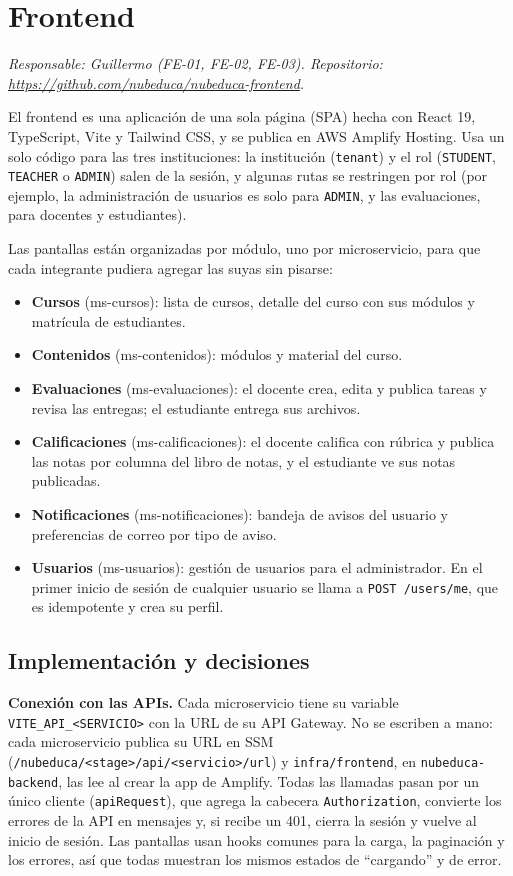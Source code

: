 \section{Frontend}
\label{sec:frontend}
\textit{Responsable: Guillermo (FE-01, FE-02, FE-03). Repositorio: \url{https://github.com/nubeduca/nubeduca-frontend}.}

El frontend es una aplicación de una sola página (SPA) hecha con React 19, TypeScript, Vite y
Tailwind CSS, y se publica en AWS Amplify Hosting. Usa un solo código para las tres instituciones:
la institución (\texttt{tenant}) y el rol (\texttt{STUDENT}, \texttt{TEACHER} o \texttt{ADMIN}) salen de
la sesión, y algunas rutas se restringen por rol (por ejemplo, la administración de usuarios es solo
para \texttt{ADMIN}, y las evaluaciones, para docentes y estudiantes).

Las pantallas están organizadas por módulo, uno por microservicio, para que cada integrante pudiera
agregar las suyas sin pisarse:
\begin{itemize}
  \item \textbf{Cursos} (ms-cursos): lista de cursos, detalle del curso con sus módulos y matrícula de estudiantes.
  \item \textbf{Contenidos} (ms-contenidos): módulos y material del curso.
  \item \textbf{Evaluaciones} (ms-evaluaciones): el docente crea, edita y publica tareas y revisa las
        entregas; el estudiante entrega sus archivos.
  \item \textbf{Calificaciones} (ms-calificaciones): el docente califica con rúbrica y publica las notas
        por columna del libro de notas, y el estudiante ve sus notas publicadas.
  \item \textbf{Notificaciones} (ms-notificaciones): bandeja de avisos del usuario y preferencias de correo por tipo de aviso.
  \item \textbf{Usuarios} (ms-usuarios): gestión de usuarios para el administrador. En el primer inicio
        de sesión de cualquier usuario se llama a \texttt{POST /users/me}, que es idempotente y crea su
        perfil.
\end{itemize}

\subsection{Implementación y decisiones}
\textbf{Conexión con las APIs.} Cada microservicio tiene su variable \texttt{VITE\_API\_<SERVICIO>} con
la URL de su API Gateway. No se escriben a mano: cada microservicio publica su URL en SSM
(\texttt{/nubeduca/<stage>/api/<servicio>/url}) y \texttt{infra/frontend}, en \texttt{nubeduca-backend},
las lee al crear la app de Amplify. Todas las llamadas pasan por un único cliente
(\texttt{apiRequest}), que agrega la cabecera \texttt{Authorization}, convierte los errores de la API en
mensajes y, si recibe un 401, cierra la sesión y vuelve al inicio de sesión. Las pantallas usan hooks
comunes para la carga, la paginación y los errores, así que todas muestran los mismos estados de
``cargando'' y de error.

